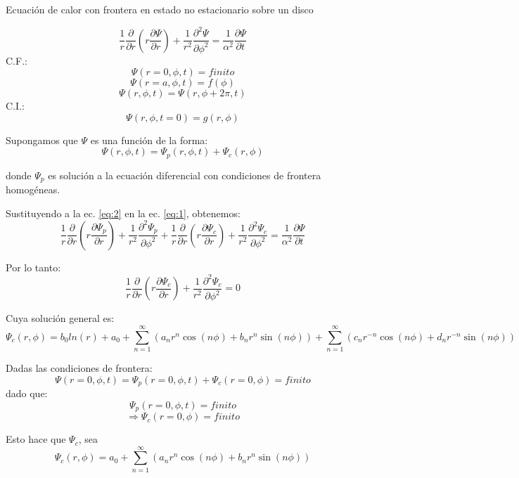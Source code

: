 \documentclass{article}
\begin{document}
Ecuación de calor con frontera en estado no estacionario sobre un disco

\begin{equation}
\label{eq:1}
\frac{1}{r}\frac{\partial}{\partial r}\left(r\frac{\partial \Psi}{\partial r}\right)+\frac{1}{r^2}\frac{\partial^2 \Psi}{\partial \phi^2}=\frac{1}{\alpha^2}\frac{\partial \Psi}{\partial t}
\end{equation}
C.F.:
$$\Psi(r=0, \phi, t) = finito$$
$$\Psi(r=a, \phi, t) = f(\phi)$$
$$\Psi(r, \phi, t)=\Psi(r, \phi+2\pi, t)$$
C.I.:
$$\Psi(r, \phi, t=0)=g(r, \phi)$$

Supongamos que $\Psi$ es una función de la forma:
\begin{equation}
\label{eq:2}
\Psi(r, \phi, t)=\Psi_p(r, \phi, t) + \Psi_c(r, \phi)
\end{equation}

donde $\Psi_p$ es solución a la ecuación diferencial con condiciones de frontera homogéneas.

Sustituyendo a la ec. \ref{eq:2} en la ec. \ref{eq:1}, obtenemos:
\begin{equation*}
\frac{1}{r}\frac{\partial}{\partial r}\left(r\frac{\partial \Psi_p}{\partial r}\right)+\frac{1}{r^2}\frac{\partial^2 \Psi_p}{\partial \phi^2}+\frac{1}{r}\frac{\partial}{\partial r}\left(r\frac{\partial \Psi_c}{\partial r}\right)+\frac{1}{r^2}\frac{\partial^2 \Psi_c}{\partial \phi^2}=\frac{1}{\alpha^2}\frac{\partial \Psi}{\partial t}
\end{equation*}

Por lo tanto:
\begin{equation}
\frac{1}{r}\frac{\partial}{\partial r}\left(r\frac{\partial \Psi_c}{\partial r}\right)+\frac{1}{r^2}\frac{\partial^2 \Psi_c}{\partial \phi^2}=0
\end{equation}\label{eq:3}

Cuya solución general es:
\begin{equation}
\label{eq:4}
\Psi_c(r,\phi)=b_0 ln(r)+a_0+\sum_{n=1}^{\infty} (a_n r^n \cos(n\phi)+b_nr^n\sin(n\phi))+\sum_{n=1}^{\infty} (c_n r^{-n} \cos(n\phi)+d_nr^{-n}\sin(n\phi))
\end{equation}

Dadas las condiciones de frontera:
$$\Psi(r=0, \phi, t)=\Psi_p(r=0, \phi, t)+\Psi_c(r=0, \phi)=finito$$
dado que:
$$\Psi_p(r=0, \phi, t)=finito$$
$$\Rightarrow \Psi_c(r=0, \phi)=finito$$

Esto hace que $\Psi_c$, sea
\begin{equation*}
\Psi_c(r,\phi)=a_0+\sum_{n=1}^{\infty} (a_n r^n \cos(n\phi)+b_nr^n\sin(n\phi))
\end{equation*}
\end{document}

